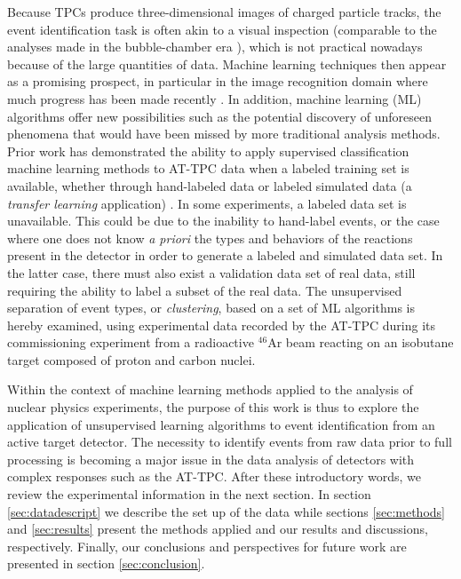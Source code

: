\documentclass[review,sort&compress]{elsarticle}
\begin{document}
Because TPCs produce three-dimensional images of charged particle tracks, the event identification task is often akin to a visual inspection (comparable to the analyses made in the bubble-chamber era \cite{Hough:1959}), which is not practical nowadays because of the large quantities of data. Machine learning techniques then appear as a promising prospect, in particular in the image recognition domain where much progress has been made recently \cite{mehta2019}. In addition, machine learning (ML) algorithms offer new possibilities such as the potential discovery of unforeseen phenomena that would have been missed by more traditional analysis methods. Prior work has demonstrated the ability to apply supervised classification machine learning methods to AT-TPC data when a labeled training set is available, whether through hand-labeled data or labeled simulated data (a {\em transfer learning} application) \cite{Kuchera2019}. In some experiments, a labeled data set is unavailable. This could be  due to the inability to hand-label events, or the case where one does not know {\em a priori} the types and behaviors of the reactions present in the detector in order to generate a labeled and simulated data set. In the latter case, there must also exist a validation data set of real data, still requiring the ability to label a subset of the real data. The unsupervised separation of event types, or {\em clustering}, based on a set of ML algorithms is hereby examined, using experimental data recorded by the AT-TPC during its commissioning experiment from a radioactive $^{46}$Ar beam reacting on an isobutane target composed of proton and carbon nuclei. 

Within the context of machine learning methods applied to the analysis of nuclear physics experiments, 
the purpose of this work is thus to explore the application of unsupervised learning algorithms to event identification from an active target detector. The necessity to identify events from raw data prior to full processing is becoming a major issue in the data analysis of detectors with complex responses such as the AT-TPC.  After these introductory words, we review the experimental information in the next section. In section \ref{sec:datadescript} we describe the set up of the data while sections \ref{sec:methods} and \ref{sec:results}
present the methods applied and our results and discussions, respectively. Finally, our conclusions and perspectives for future work are presented in section \ref{sec:conclusion}.
\end{document}
